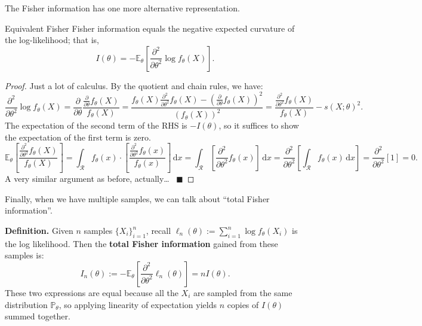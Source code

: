 The Fisher information has one more alternative representation.

\begin{theorem}{Equivalent Fisher}
    Fisher information equals the negative expected curvature of the log-likelihood; that is,
    \[ I(\theta) = -\mathbb{E}_{\theta}\left[
        \frac{\partial^2}{\partial\theta^2} \log f_{\theta}(X)
    \right]. \]
\end{theorem}

\begin{proof}
    Just a lot of calculus.  By the quotient and chain rules, we have:
    \[ \frac{\partial^2}{\partial\theta^2} \log f_{\theta}(X)
    = \frac{\partial}{\partial\theta} \frac{\frac{\partial}{\partial\theta} f_{\theta}(X)}{f_{\theta}(X)} 
    = \frac{f_{\theta}(X) \frac{\partial^2}{\partial\theta^2} f_{\theta}(X)
    - \left(\frac{\partial}{\partial\theta} f_{\theta}(X)\right)^2}{
        \left(f_{\theta}(X)\right)^2
    }
    = \frac{\frac{\partial^2}{\partial\theta^2} f_{\theta}(X)}{f_{\theta}(X)}
    - s(X; \theta)^2. \]
    The expectation of the second term of the RHS is $-I(\theta)$,
    so it suffices to show the expectation of the first term is zero.
    \[ \mathbb{E}_{\theta}\left[\frac{\frac{\partial^2}{\partial\theta^2} f_{\theta}(X)}{f_{\theta}(X)}\right]
    = \int_{\mathcal{R}} f_{\theta}(x) \cdot \left[
        \frac{\frac{\partial^2}{\partial\theta^2} f_{\theta}(x)}{f_{\theta}(x)}
    \right] \, \mathrm{d}x
    = \int_{\mathcal{R}} \left[\frac{\partial^2}{\partial\theta^2} f_{\theta}(x)\right] \, \mathrm{d}x
    = \frac{\partial^2}{\partial\theta^2} \left[\int_{\mathcal{R}} f_{\theta}(x) \, \mathrm{d}x\right]
    = \frac{\partial^2}{\partial\theta^2} [1] = 0. \]
    A very similar argument as before, actually\dots ~ $\blacksquare$
\end{proof}

Finally, when we have multiple samples,
we can talk about ``total Fisher information''.

\textbf{Definition.} Given $n$ samples $\{X_i\}_{i = 1}^n$,
recall $\ell_n(\theta) := \sum_{i = 1}^n \log f_{\theta}(X_i)$
is the log likelihood.
Then the \textbf{total Fisher information} gained from these samples is:
\[ I_n(\theta) :=
-\mathbb{E}_{\theta}\left[\frac{\partial^2}{\partial\theta^2}\ell_n(\theta)\right]
= n I(\theta). \]
These two expressions are equal because all the $X_i$ are sampled from
the same distribution $\mathbb{P}_{\theta}$, so applying linearity of expectation
yields $n$ copies of $I(\theta)$ summed together.

